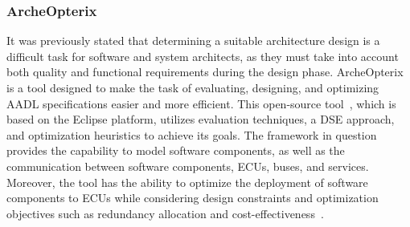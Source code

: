 \subsubsection{ArcheOpterix}
It was previously stated that determining a suitable architecture design is a difficult task for software and system architects, as they must take into account both quality and functional requirements during the design phase.
ArcheOpterix is a tool designed to make the task of evaluating, designing, and optimizing AADL specifications easier and more efficient. This open-source tool~\cite{aleti2009archeopterix}, which is based on the Eclipse platform, utilizes evaluation techniques, a DSE approach, and optimization heuristics to achieve its goals.
The framework in question provides the capability to model software components, as well as the communication between software components, ECUs, buses, and services. Moreover, the tool has the ability to optimize the deployment of software components to ECUs while considering design constraints and optimization objectives such as redundancy allocation and cost-effectiveness~\cite{aleti2009archeopterix}.







